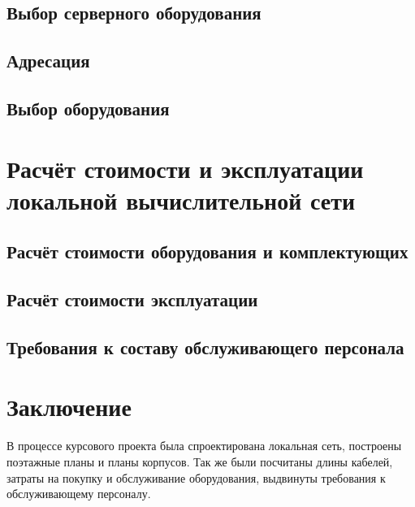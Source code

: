 \documentclass[a4paper,14pt,russian]{article}
\begin{document}
\subsection{Выбор серверного оборудования}


\subsection{Адресация}


\subsection{Выбор оборудования}


\section{Расчёт стоимости и эксплуатации локальной вычислительной сети}

\subsection{Расчёт стоимости оборудования и комплектующих}


\subsection{Расчёт стоимости эксплуатации}


\subsection{Требования к составу обслуживающего персонала}


\section*{Заключение}
В процессе курсового проекта была спроектирована локальная сеть, построены поэтажные планы и планы корпусов. Так же были посчитаны длины кабелей, затраты на покупку и обслуживание оборудования, выдвинуты требования к обслуживающему персоналу.

\renewcommand\refname{Список использованных источников}
\nocite{*}


\appendix
\end{document}
